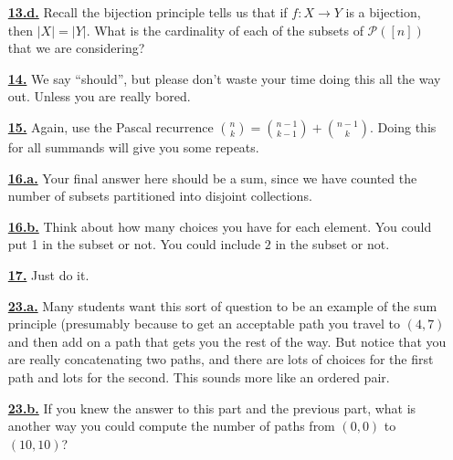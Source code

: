 \documentclass[10pt,]{book}
\theoremstyle{plain}
\theoremstyle{definition}
\theoremstyle{definition}
\theoremstyle{definition}
\numberwithin{equation}{chapter}
\def\pow{\mathcal P}
\newcommand{\card}[1]{\left| #1 \right|}
\begin{document}
\begin{itemize}[itemsep=1em]
\hypertarget{a-13.d}{}\item[\textbf{\hyperref[task-39]{13.d.}}]
\hypertarget{p-120}{}%
Recall the bijection principle tells us that if \(f:X \to Y\) is a bijection, then \(\card{X} = \card{Y}\).  What is the cardinality of each of the subsets of \(\pow([n])\) that we are considering?%

\hypertarget{a-14}{}\item[\textbf{\hyperref[act-pascalrowsum-alg]{14.}}]
\hypertarget{p-126}{}%
We say ``should'', but please don't waste your time doing this all the way out.  Unless you are really bored.%

\hypertarget{a-15}{}\item[\textbf{\hyperref[activity-15]{15.}}]
\hypertarget{p-128}{}%
Again, use the Pascal recurrence \(\binom{n}{k} = \binom{n-1}{k-1} + \binom{n-1}{k}\).  Doing this for all summands will give you some repeats.%

\hypertarget{a-16.a}{}\item[\textbf{\hyperref[task-40]{16.a.}}]
\hypertarget{p-135}{}%
Your final answer here should be a sum, since we have counted the number of subsets partitioned into disjoint collections.%

\hypertarget{a-16.b}{}\item[\textbf{\hyperref[task-41]{16.b.}}]
\hypertarget{p-138}{}%
Think about how many choices you have for each element.  You could put 1 in the subset or not.  You could include \(2\) in the subset or not.%

\hypertarget{a-17}{}\item[\textbf{\hyperref[act-pascalrowsum-binom]{17.}}]
\hypertarget{p-144}{}%
Just do it.%

\hypertarget{a-23.a}{}\item[\textbf{\hyperref[task-58]{23.a.}}]
\hypertarget{p-183}{}%
Many students want this sort of question to be an example of the sum principle (presumably because to get an acceptable path you travel to \((4,7)\) and then add on a path that gets you the rest of the way.  But notice that you are really concatenating two paths, and there are lots of choices for the first path and lots for the second.  This sounds more like an ordered pair.%

\hypertarget{a-23.b}{}\item[\textbf{\hyperref[task-59]{23.b.}}]
\hypertarget{p-185}{}%
If you knew the answer to this part and the previous part, what is another way you could compute the number of paths from \((0,0)\) to \((10,10)\)?%


\end{itemize}
\end{document}
